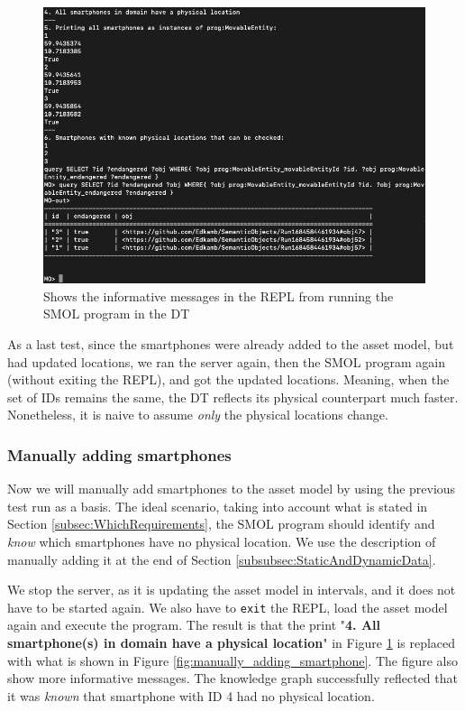 \documentclass{article}
\begin{document}
\begin{figure}[H]
    \centering
    \includegraphics[scale=0.40]{graphics/digital_twin_repl.png}
    \caption{Shows the informative messages in the REPL from running the SMOL program in the DT}
    \label{fig:digital_twin_repl}
\end{figure}

As a last test, since the smartphones were already added to the asset model, but had updated locations, we ran the server again, then the SMOL program again (without exiting the REPL), and got the updated locations. Meaning, when the set of IDs remains the same, the DT reflects its physical counterpart much faster. Nonetheless, it is naive to assume \emph{only} the physical locations change.

 
\subsubsection{Manually adding smartphones}
Now we will manually add smartphones to the asset model by using the previous test run as a basis. The ideal scenario, taking into account what is stated in Section \ref{subsec:WhichRequirements}, the SMOL program should identify and \emph{know} which smartphones have no physical location. We use the description of manually adding it at the end of Section \ref{subsubsec:StaticAndDynamicData}. 

We stop the server, as it is updating the asset model in intervals, and it does not have to be started again. We also have to \verb|exit| the REPL, load the asset model again and execute the program. 
The result is that the print "\textbf{4. All smartphone(s) in domain have a physical location}" in Figure \ref{fig:digital_twin_repl} is replaced with what is shown in Figure \ref{fig:manually_adding_smartphone}. The figure also show more informative messages. The knowledge graph successfully reflected that it was \emph{known} that smartphone with ID 4 had no physical location.
\end{document}
